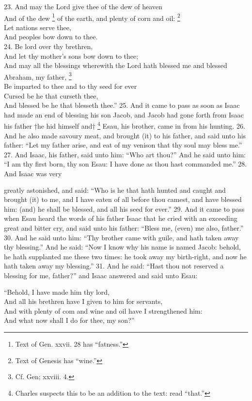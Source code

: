 23. And may the Lord give thee of the dew of heaven\\
And of the dew \footnote{Text of Gen. xxvii. 28 has ``fatness.''} of the earth, and plenty of corn and oil: \footnote{Text of Genesis has ``wine.''}\\
Let nations serve thee,\\
And peoples bow down to thee.\\
24. Be lord over thy brethren,\\
And let thy mother's sons bow down to thee;\\
And may all the blessings wherewith the Lord hath blessed me and blessed Abraham, my father, \footnote{Cf. Gen; xxviii. 4.}\\
Be imparted to thee and to thy seed for ever\\
Cursed be he that curseth thee,\\
And blessed be he that blesseth thee.'' 25. And it came to pass as soon as Isaac had made an end of blessing his son Jacob, and Jacob had gone forth from Isaac his father †he hid himself and† \footnote{Charles suspects this to be an addition to the text: read ``that.''} Esau, his brother, came in from his hunting. 26. And he also made savoury meat, and brought (it) to his father, and said unto his father: ``Let my father arise, and eat of my venison that thy soul may bless me.'' 27. And Isaac, his father, said unto him: ``Who art thou?'' And he said unto him: ``I am thy first born, thy son Esau: I have done as thou hast commanded me.'' 28. And Isaac was very

greatly astonished, and said: ``Who is he that hath hunted and caught and brought (it) to me, and I have eaten of all before thou camest, and have blessed him: (and) he shall be blessed, and all his seed for ever.'' 29. And it came to pass when Esau heard the words of his father Isaac that he cried with an exceeding great and bitter cry, and said unto his father: ``Bless me, (even) me also, father.'' 30. And he said unto him: ``Thy brother came with guile, and hath taken away thy blessing.'' And he said: ``Now I know why his name is named Jacob: behold, he hath supplanted me these two times: he took away my birth-right, and now he hath taken away my blessing.'' 31. And he said: ``Hast thou not reserved a blessing for me, father?'' and Isaac answered and said unto Esau:

``Behold, I have made him thy lord,\\
And all his brethren have I given to him for servants,\\
And with plenty of com and wine and oil have I strengthened him:\\
And what now shall I do for thee, my son?''

